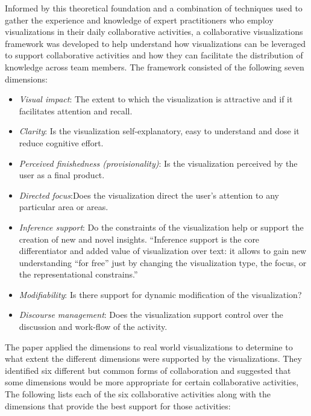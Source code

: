 \documentclass{sig-alternate}
\begin{document}
Informed by  this theoretical foundation and a combination of techniques used
to gather the experience and knowledge of expert practitioners who employ
visualizations in their daily collaborative activities, a collaborative
visualizations framework was developed to help understand how visualizations can
be leveraged to support collaborative activities and how they can facilitate the
distribution of knowledge across team members. The framework consisted of the
following seven dimensions:

\begin{itemize}
  \item \emph{Visual impact}: The extent to which the visualization is
  attractive and if it facilitates attention and recall. \item \emph{Clarity}:
  Is the visualization self-explanatory, easy to understand and dose it reduce
  cognitive effort. \item \emph{Perceived finishedness (provisionality)}: Is
  the visualization perceived by the user as a final product. \item
  \emph{Directed focus}:Does the visualization direct the user's attention to
  any particular area or areas. \item \emph{Inference support}: Do the
  constraints of the visualization help or  support the creation of new and
  novel insights. ``Inference support is the core differentiator and added
  value of visualization over text: it allows to gain new understanding ``for
  free'' just by changing the visualization type, the focus, or the
  representational constrains.'' \cite{Bresciani:ACollaborativeDimensionsFramework}
  \item \emph{Modifiability}: Is there support for dynamic modification of
  the visualization?
  \item \emph{Discourse management}: Does the visualization support control
  over the discussion and work-flow of the activity.
  \end{itemize}
  The paper applied the dimensions to real world visualizations to determine
  to what extent the different dimensions were supported by the
  visualizations. They identified six different but common forms of
  collaboration and suggested that some dimensions would be more appropriate
  for certain collaborative activities, The following lists each of the six
  collaborative activities along with the dimensions that provide the best
  support for those activities:
\end{document}
